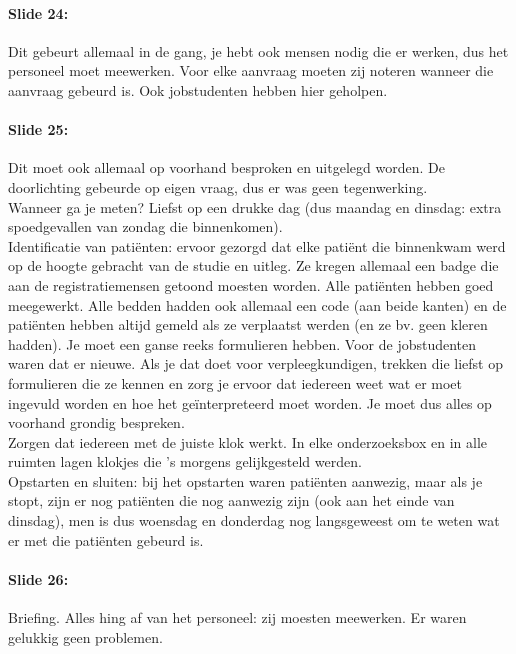 \documentclass[10pt,a4paper]{report}
\begin{document}
\paragraph{Slide 24:} Dit gebeurt allemaal in de gang, je hebt ook mensen nodig die er werken, dus het personeel moet meewerken. Voor elke aanvraag moeten zij noteren wanneer die aanvraag gebeurd is. Ook jobstudenten hebben hier geholpen. 

\paragraph{Slide 25:} Dit moet ook allemaal op voorhand besproken en uitgelegd worden. De doorlichting gebeurde op eigen vraag, dus er was geen tegenwerking.\\
Wanneer ga je meten? Liefst op een drukke dag (dus maandag en dinsdag: extra spoedgevallen van zondag die binnenkomen).\\
Identificatie van pati\"enten: ervoor gezorgd dat elke pati\"ent die binnenkwam werd op de hoogte gebracht van de studie en uitleg. Ze kregen allemaal een badge die aan de registratiemensen getoond moesten worden. Alle pati\"enten hebben goed meegewerkt. Alle bedden hadden ook allemaal een code (aan beide kanten) en de pati\"enten hebben altijd gemeld als ze verplaatst werden (en ze bv. geen kleren hadden).
Je moet een ganse reeks formulieren hebben. Voor de jobstudenten waren dat er nieuwe. Als je dat doet voor verpleegkundigen, trekken die liefst op formulieren die ze kennen en zorg je ervoor dat iedereen weet wat er moet ingevuld worden en hoe het ge\"interpreteerd moet worden. Je moet dus alles op voorhand grondig bespreken.\\
Zorgen dat iedereen met de juiste klok werkt. In elke onderzoeksbox en in alle ruimten lagen klokjes die 's morgens gelijkgesteld werden.\\
Opstarten en sluiten: bij het opstarten waren pati\"enten aanwezig, maar als je stopt, zijn er nog pati\"enten die nog aanwezig zijn (ook aan het einde van dinsdag), men is dus woensdag en donderdag nog langsgeweest om te weten wat er met die pati\"enten gebeurd is.

\paragraph{Slide 26:} Briefing. Alles hing af van het personeel: zij moesten meewerken. Er waren gelukkig geen problemen. 
\end{document}
